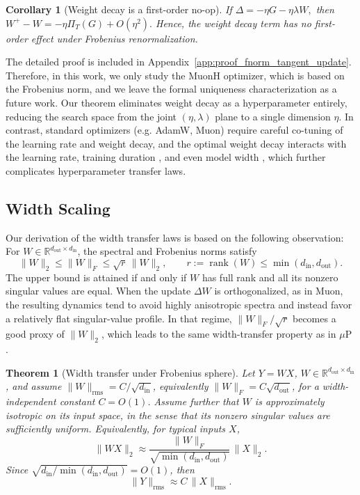 \documentclass{article}
\newtheorem{theorem}{Theorem}[]
\newtheorem{corollary}{Corollary}[theorem]
\begin{document}
\begin{corollary}[Weight decay is a first-order no-op]
\label{cor:wd_noop}
If
$
\Delta = -\eta G - \eta \lambda W,
$
then
$
W^+ - W
=
-\eta \Pi_T(G) + O(\eta^2).
$
Hence, the weight decay term has no first-order effect under Frobenius renormalization.
\end{corollary}

The detailed proof is included in Appendix~\ref{app:proof_fnorm_tangent_update}.  Therefore, in this work, we only study the MuonH optimizer, which is based on the Frobenius norm, and we leave the formal uniqueness characterization as a future work.
Our theorem eliminates weight decay as a hyperparameter entirely, reducing the search space from the joint $(\eta, \lambda)$ plane to a single dimension $\eta$. In contrast, standard optimizers (e.g. AdamW, Muon) require careful co-tuning of the learning rate and weight decay, and the optimal weight decay interacts with the learning rate, training duration \cite{wang2024set,bergsma2025power}, and even model width \cite{chen2025how}, which further complicates hyperparameter transfer laws.


\subsection{Width Scaling}\label{sec:width}

Our derivation of the width transfer laws is based on the following observation: For $W \in \mathbb{R}^{d_{\mathrm{out}}\times d_{\mathrm{in}}}$, the spectral and Frobenius norms satisfy
\[
\|W\|_2 \le \|W\|_F \le \sqrt{r}\,\|W\|_2,
\qquad
r := \operatorname{rank}(W) \le \min(d_{\mathrm{in}},d_{\mathrm{out}}).
\]
The upper bound is attained if and only if $W$ has full rank and all its nonzero singular values are equal. When the update $\Delta W$ is orthogonalized, as in Muon, the resulting dynamics tend to avoid highly anisotropic spectra and instead favor a relatively flat singular-value profile. In that regime, $\|W\|_F/\sqrt{r}$ becomes a good proxy of $\|W\|_2$, which leads to the same width-transfer property as in $\mu$P \cite{yang2022tensor}.

\begin{theorem}[Width transfer under Frobenius sphere]
\label{thm:width-scaling-hyperball}
Let $Y = WX$, $W \in \mathbb{R}^{d_{\mathrm{out}}\times d_{\mathrm{in}}}$, and assume
$\|W\|_{\mathrm{rms}} = C/\sqrt{d_{\mathrm{in}}}$,
equivalently $\|W\|_F = C\sqrt{d_{\mathrm{out}}}$,
for a width-independent constant $C=O(1)$.
Assume further that $W$ is approximately isotropic on its input space, in the sense that its nonzero singular values are sufficiently uniform. Equivalently, for typical inputs $X$,
\[
\|WX\|_2 \approx \frac{\|W\|_F}{\sqrt{\min(d_{\mathrm{in}},d_{\mathrm{out}})}}\,\|X\|_2.
\]
Since $\sqrt{d_{\mathrm{in}}/ \min(d_{\mathrm{in}},d_{\mathrm{out}})} = O(1)$, then
\[
\|Y\|_{\mathrm{rms}}
\approx
C\,\|X\|_{\mathrm{rms}}.
\]
\end{theorem}
\end{document}
